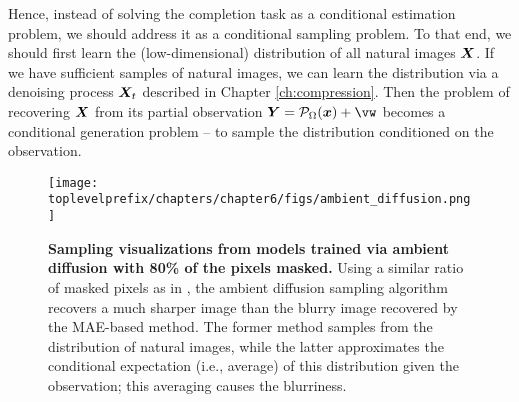 \documentclass[../../book-main.tex]{subfiles}
\begin{document}
Hence, instead of solving the completion task as a conditional estimation problem, we should address it as a conditional sampling problem. To that end, we should first learn the (low-dimensional) distribution of all natural images $\bm{X}$. If we have sufficient samples of natural images, we can learn the distribution via a denoising process $\bm{X}_t$ described in Chapter \ref{ch:compression}. Then the problem of recovering $\bm{X}$ from its partial observation $\Y = \mathcal{P}_\Omega(\x) +\vw$ becomes a conditional generation problem -- to sample the distribution conditioned on the observation.

\begin{figure}
  \centering
  \texttt{[image: \\toplevelprefix/chapters/chapter6/figs/ambient\_diffusion.png]}
  \caption{\small \textbf{Sampling visualizations from models trained via ambient diffusion \cite{Daras-NIPS2023} with 80\% of the pixels masked.} Using a similar ratio of masked pixels as in , the ambient diffusion sampling algorithm recovers a much sharper image than the blurry image recovered by the MAE-based method. The former method samples from the distribution of natural images, while the latter approximates the conditional expectation (i.e., average) of this distribution given the observation; this averaging causes the blurriness.}
  \label{fig:ambient_diffusion}
\end{figure}
\end{document}
